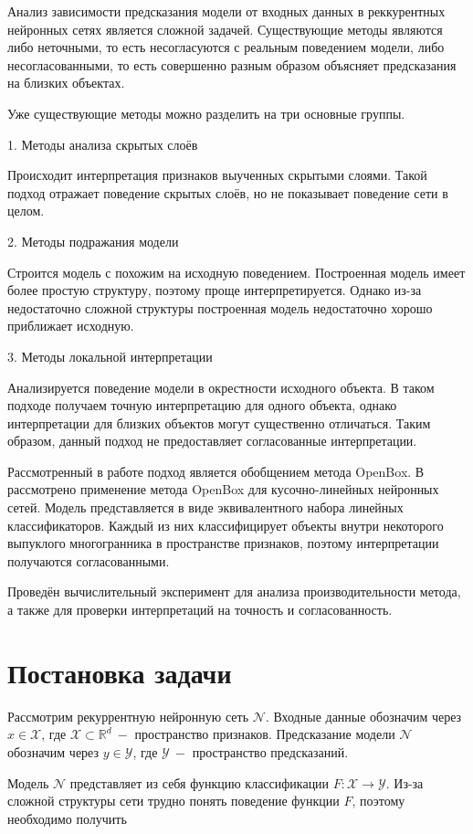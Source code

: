 \documentclass[12pt, twoside]{article}
\begin{document}
Анализ зависимости предсказания модели от входных данных в реккурентных нейронных сетях является сложной задачей. Существующие методы являются либо неточными, то есть несогласуются с реальным поведением модели, либо несогласованными, то есть совершенно разным образом объясняет предсказания на близких объектах.

Уже существующие методы можно разделить на три основные группы.

1. Методы анализа скрытых слоёв

Происходит интерпретация признаков выученных скрытыми слоями. Такой подход отражает поведение скрытых слоёв, но не показывает поведение сети в целом.

2. Методы подражания модели

Строится модель с похожим на исходную поведением. Построенная модель имеет более простую структуру, поэтому проще интерпретируется. Однако из-за недостаточно сложной структуры построенная модель недостаточно хорошо приближает исходную.

3. Методы локальной интерпретации

Анализируется поведение модели в окрестности исходного объекта. В таком подходе получаем точную интерпретацию для одного объекта, однако интерпретации для близких объектов могут существенно отличаться. Таким образом, данный подход не предоставляет согласованные интерпретации.

Рассмотренный в работе подход является обобщением метода OpenBox. В \cite{chu2019exact} рассмотрено применение метода OpenBox для кусочно-линейных нейронных сетей. Модель представляется в виде эквивалентного набора линейных классификаторов. Каждый из них классифицирует объекты внутри некоторого выпуклого многогранника в пространстве признаков, поэтому интерпретации получаются согласованными.

Проведён вычислительный эксперимент для анализа производительности метода, а также для проверки интерпретаций на точность и согласованность. 

\section{Постановка задачи}
Рассмотрим рекуррентную нейронную сеть $\mathcal{N}$. Входные данные обозначим через $x \in \mathcal{X}$, где $\mathcal{X} \subset \mathbb{R}^d~-$ пространство признаков. Предсказание модели $\mathcal{N}$ обозначим через $y \in \mathcal{Y}$, где $\mathcal{Y}~-$ пространство предсказаний.

Модель $\mathcal{N}$ представляет из себя функцию классификации $F: \mathcal{X} \to \mathcal{Y}$. Из-за сложной структуры сети трудно понять поведение функции $F$, поэтому необходимо получить 

%
%
\end{document}
